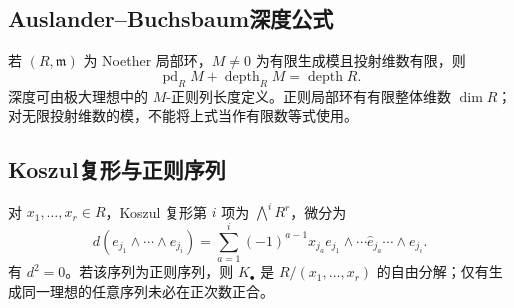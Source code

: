 \documentclass[../main.tex]{subfiles}
\begin{document}
\subsection{Auslander--Buchsbaum深度公式}
若 $(R,\mathfrak m)$ 为 Noether 局部环，$M\ne0$ 为有限生成模且投射维数有限，则
\[
\operatorname{pd}_RM+\operatorname{depth}_RM=\operatorname{depth}R.
\]
深度可由极大理想中的 $M$-正则列长度定义。正则局部环有有限整体维数 $\dim R$；对无限投射维数的模，不能将上式当作有限数等式使用。
\subsection{Koszul复形与正则序列}
对 $x_1,\ldots,x_r\in R$，Koszul 复形第 $i$ 项为 $\bigwedge^iR^r$，微分为
\[
d(e_{j_1}\wedge\cdots\wedge e_{j_i})=
\sum_{a=1}^i(-1)^{a-1}x_{j_a}
e_{j_1}\wedge\cdots\widehat e_{j_a}\cdots\wedge e_{j_i}.
\]
有 $d^2=0$。若该序列为正则序列，则 $K_\bullet$ 是 $R/(x_1,\ldots,x_r)$ 的自由分解；仅有生成同一理想的任意序列未必在正次数正合。
\clearpage
\end{document}
